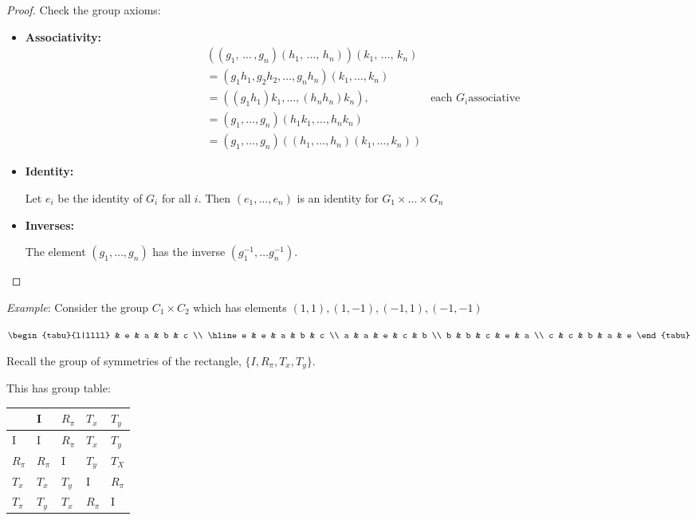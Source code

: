 \documentclass{article}
\theoremstyle{definition} \newtheorem*{definition}{Definition}
\begin{document}
\begin{proof} Check the group axioms: \begin{itemize} \item
          \textbf{Associativity:} \begin{align*} & ((g_1, \, \ldots \, ,
            g_n)(h_1,\, \ldots, \, h_n)) (k_1, \, \ldots , \, k_n) & \\ &= (g_1
            h_1, g_2 h_2, \ldots, g_n h_n) (k_1, \ldots , k_n) & \\ &= ((g_1
            h_1)k_1, \ldots , (h_n h_n)k_n), & \text{each } G_i \text{
            associative}\\ &= (g_1, \ldots, g_n) (h_1 k_1, \ldots, h_n k_n) &
            \\ &= (g_1, \ldots, g_n) ((h_1, \ldots, h_n) (k_1, \ldots, k_n)) &
        \end{align*} \item \textbf{Identity:}

Let $e_i$ be the identity of $G_i$ for all $i$. Then $(e_1, \ldots, e_n)$ is an
identity for $G_1 \times \ldots \times G_n$ \item \textbf{Inverses:}

The element $(g_1, \ldots , g_n)$ has the inverse $(g_1^{-1}, \ldots
g_n^{-1})$.

\end{itemize}

\end{proof} \emph{Example}: Consider the group $C_1 \times C_2$ which has
elements $(1,1), (1,-1),(-1,1),(-1,-1)$

\begin{table}[h] \centering \label{my-label} $\begin{tabu}{l|llll} & e & a & b
    & c \\ \hline e & e & a & b & c \\ a & a & e & c & b \\ b & b & c & e & a
    \\ c & c & b & a & e \end{tabu}$ \end{table}

Recall the group of symmetries of the rectangle, $\{I, R_\pi, T_x, T_y\}$.

This has group table:

\begin{table}[h] \centering \label{my-label} \begin{tabular}{l|llll} & I      &
    $R_\pi$ & $T_x$   & $T_y$   \\ \hline I      & I      & $R_\pi$ & $T_x$   &
    $T_y$   \\ $R_\pi$ & $R_\pi$ & I      & $T_y$   & $T_X$    \\ $T_x$   &
    $T_x$   & $T_y$   & I      & $R_\pi$ \\ $T_\pi$ & $T_y$   & $T_x$   &
    $R_\pi$ & I     \end{tabular} \end{table}
\end{document}
